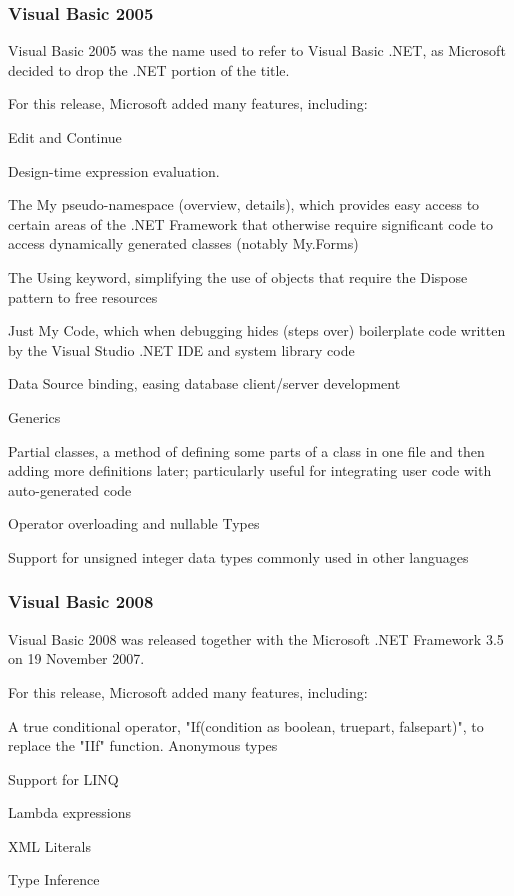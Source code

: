 \subsubsection{Visual Basic 2005}
Visual Basic 2005 was the name used to refer to Visual Basic .NET, as Microsoft decided to drop the .NET portion of the title.

For this release, Microsoft added many features, including:

Edit and Continue

Design-time expression evaluation.

The My pseudo-namespace (overview, details), which provides easy access to certain areas of the .NET Framework that otherwise require significant code to access dynamically generated classes (notably My.Forms)

The Using keyword, simplifying the use of objects that require the Dispose pattern to free resources

Just My Code, which when debugging hides (steps over) boilerplate code written by the Visual Studio .NET IDE and system library code

Data Source binding, easing database client/server development

Generics

Partial classes, a method of defining some parts of a class in one file and then adding more definitions later; particularly useful for integrating user code with auto-generated code

Operator overloading and nullable Types

Support for unsigned integer data types commonly used in other languages



\subsubsection{Visual Basic 2008}
Visual Basic 2008 was released together with the Microsoft .NET Framework 3.5 on 19 November 2007.

For this release, Microsoft added many features, including:

A true conditional operator, "If(condition as boolean, truepart, falsepart)", to replace the "IIf" function.
Anonymous types

Support for LINQ

Lambda expressions

XML Literals

Type Inference

